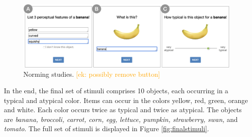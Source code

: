 \documentclass[a4paper,man,floatsintext,natbib]{apa6}
\newcommand{\ek}[1]{\textcolor{Orange}{[ek: #1]}}
\begin{document}
\begin{figure}
	\includegraphics[width=\linewidth]{img/norming/all_norming_designs.pdf}
	\caption{Norming studies. \ek{possibly remove button}}
	\label{fig:norming-designs}
\end{figure}



In the end, the final set of stimuli comprises 10 objects, each occurring in a typical and atypical color.
Items can occur in the colors yellow, red, green, orange and white. Each color occurs twice as typical and twice as atypical. The objects are \textit{banana, broccoli, carrot, corn, egg, lettuce, pumpkin, strawberry, swan,} and \textit{tomato}. The full set of stimuli is displayed in Figure \ref{fig:finalstimuli}.




\end{document}

